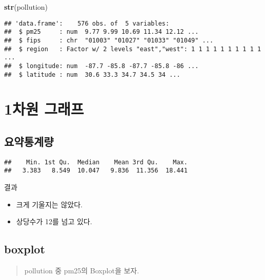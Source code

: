 \documentclass[
]{article}
\newenvironment{Shaded}{\begin{snugshade}}{\end{snugshade}}
\newcommand{\FunctionTok}[1]{\textcolor[rgb]{0.13,0.29,0.53}{\textbf{#1}}}
\newcommand{\NormalTok}[1]{#1}
\newcommand{\SpecialCharTok}[1]{\textcolor[rgb]{0.81,0.36,0.00}{\textbf{#1}}}
\begin{document}
\begin{Shaded}
\begin{Highlighting}[]
\FunctionTok{str}\NormalTok{(pollution)}
\end{Highlighting}
\end{Shaded}

\begin{verbatim}
## 'data.frame':    576 obs. of  5 variables:
##  $ pm25     : num  9.77 9.99 10.69 11.34 12.12 ...
##  $ fips     : chr  "01003" "01027" "01033" "01049" ...
##  $ region   : Factor w/ 2 levels "east","west": 1 1 1 1 1 1 1 1 1 1 ...
##  $ longitude: num  -87.7 -85.8 -87.7 -85.8 -86 ...
##  $ latitude : num  30.6 33.3 34.7 34.5 34 ...
\end{verbatim}

\section{1차원 그래프}\label{uxcc28uxc6d0-uxadf8uxb798uxd504}

\subsection{요약통계량}\label{uxc694uxc57duxd1b5uxacc4uxb7c9}

\begin{Shaded}
\end{Shaded}

\begin{verbatim}
##    Min. 1st Qu.  Median    Mean 3rd Qu.    Max. 
##   3.383   8.549  10.047   9.836  11.356  18.441
\end{verbatim}

결과

\begin{itemize}
\item
  크게 기울지는 않았다.
\item
  상당수가 12를 넘고 있다.
\end{itemize}

\subsection{boxplot}\label{boxplot}

\begin{quote}
pollution 중 pm25의 Boxplot을 보자.
\end{quote}
\end{document}
